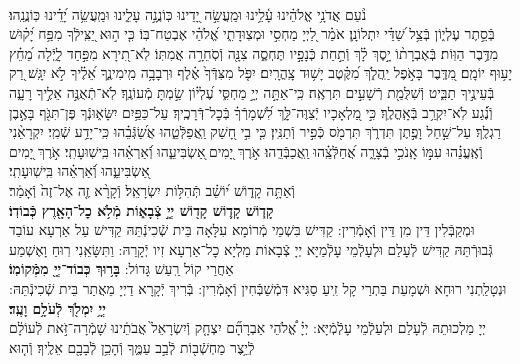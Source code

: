 \documentclass[twoside, openany, parskip=half, 11pt]{book}
\begin{document}
\halfkaddish


\label{vihi noam}
 \\
נֹ֨עַם אֲדֹנָ֥י אֱלֹהֵ֗ינוּ עָ֫לֵ֥ינוּ וּמַֽעֲשֵׂ֣ה יָ֭דֵינוּ כּֽוֹנֲנָ֣ה עָלֵ֑ינוּ וּמַֽעֲשֵׂ֥ה יָ֝דֵ֗ינוּ כּֽוֹנֲנֵֽהוּ׃\\
בְּֿסֵ֣תֶר עֶלְי֑וֹן בְּֿצֵ֥ל שַׁ֝דַּ֗י יִתְלוֹנָֽן׃
אֹמַ֗ר לַ֭יְיָ מַחְסִ֣י וּמְצֽוּדָתִ֑י אֱ֝לֹהַ֗י אֶבְטַח־בּֽוֹ׃
כִּ֤י ה֣וּא יַ֭צִּֽילְֿךָ מִפַּ֥ח יָ֝ק֗וּשׁ מִדֶּ֥בֶר הַוּֽוֹת׃
בְּֿאֶבְרָת֨וֹ יָ֣סֶךְ לָ֗ךְ וְֿתַ֣חַת כְּֿנָפָ֣יו תֶּחְסֶ֑ה צִנָּ֖ה וְֿסֹֽחֵרָ֣ה אֲמִתּֽוֹ׃
לֹֽא־תִ֭ירָא מִפַּ֣חַד לָ֑יְֿלָה מֵ֝חֵ֗ץ יָע֥וּף יוֹמָֽם׃
מִ֭דֶּֽבֶר בָּאֹ֣פֶל יַֽהֲלֹ֑ךְ מִ֝קֶּ֗טֶב יָשׁ֥וּד צָֽהֳרָֽיִם׃
יִפֹּ֤ל מִצִּדְּֿךָ֙ אֶ֗לֶף וּרְבָבָ֥ה מִֽימִינֶ֑ךָ אֵ֝לֶ֗יךָ לֹ֣א יִגָּֽשׁ׃
רַ֭ק בְּֿעֵינֶ֣יךָ תַבִּ֑יט וְֿשִׁלֻּמַ֖ת רְֿשָׁעִ֣ים תִּרְאֶֽה׃
כִּֽי־אַתָּ֣ה יְיָ֣ מַחְסִּ֑י עֶ֝לְי֗וֹן שַׂ֣מְתָּ מְֿעוֹנֶֽךָ׃
לֹֽא־תְֿאֻנֶּ֣ה אֵלֶ֣יךָ רָעָ֑ה וְֿנֶ֗֝גַע לֹֽא־יִקְרַ֥ב בְּֿאָֽהֳלֶֽךָ׃
כִּ֣י מַ֭לְאָכָיו יְֿצַוֶּה־לָּ֑ךְ לִ֝שְׁמָרְֿךָ֗ בְּֿכׇל־דְּֿרָכֶֽיךָ׃
עַל־כַּפַּ֥יִם יִשָּׂא֑וּנְֿךָ פֶּן־תִּגֹּ֖ף בָּאֶ֣בֶן רַגְלֶֽךָ׃
עַל־שַׁ֣חַל וָפֶ֣תֶן תִּדְרֹ֑ךְ תִּרְמֹ֖ס כְּֿפִ֣יר וְֿתַנִּֽין׃
כִּ֤י בִ֣י חָ֭שַׁק וַֽאֲפַלְּֿטֵ֑הוּ אֲשַׂ֝גְּֿבֵ֗הוּ כִּֽי־יָדַ֥ע שְֿׁמִֽי׃
יִקְרָאֵ֨נִי וְֽֿאֶֽעֱנֵ֗הוּ עִמּ֣וֹ אָֽנֹכִ֣י בְֿצָרָ֑ה אֲ֝חַלְּֿצֵֽ֗הוּ וַֽאֲכַבְּֿדֵֽהוּ׃
אֹ֣רֶךְ יָ֭מִים ֖אַשְׂבִּיעֵ֑הוּ וְֿ֝אַרְאֵ֗הוּ בִּֽישֽׁוּעָתִֽי׃
אֹ֣רֶךְ יָ֭מִים ֖אַשְׂבִּיעֵ֑הוּ וְֿ֝אַרְאֵ֗הוּ בִּֽישֽׁוּעָתִֽי׃\\
\label{v ata kadosh}
וְֿאַתָּ֥ה
%
קָד֑וֹשׁ י֝וֹשֵׁ֗ב תְּֿהִלּ֥וֹת יִשְׂרָאֵֽל׃
%
וְֿקָרָ֨א זֶ֤ה אֶל־זֶה֙ וְֿאָמַ֔ר׃\\
\textbf{קָד֧וֹשׁ קָד֛וֹשׁ קָד֖וֹשׁ יְיָ֣ צְֿבָא֑וֹת מְֿלֹ֥א כׇל־הָאָ֖רֶץ כְּֿבוֹדֽוֹ׃}\\
וּמְקַבְּֿלִין דֵּין מִן דֵּין וְֿאָמְֿרִין: קַדִּישׁ בִּשְׁמֵי מְֿרוֹמָא עִלָּאָה בֵּית שְֿׁכִינְֿתֵּהּ קַדִּישׁ עַל אַרְעָא עוֹבַד גְּֿבוּרְֿתֵּהּ קַדִּישׁ לְֿעָלַם וּלְעָלְֿמֵי עָלְֿמַיָּא יְיָ צְֿבָאוֹת מַלְיָא כׇל־אַרְעָא זִיו יְֿקָרֵהּ:  וַתִּשָּׂאֵֽנִי רֽוּחַ וָאֶשְׁמַע אַחֲרַי קוֹל רַֽעַשׁ גָּדוֹל:
\textbf{בָּר֥וּךְ כְּבוֹד־יְיָ֖ מִמְּֿקוֹמֽוֹ׃} \\
וּנְטָלַֽתְנִי רוּחָא וּשְׁמָעֵת בַּתְרַי קָל זִֽיעַ סַגִּיא דִּמְֿשַׁבְּֿחִין וְֿאָמְֿרִין: בְּֿרִיךְ יְֿקָרָא דַיְיָ מֵאֲתַר בֵּית שְֿׁכִינְֿתֵּהּ:
\textbf{יְיָ֥ יִמְלֹ֖ךְ לְֿעֹלָ֥ם וָעֶֽד׃} \\
יְיָ מַלְכוּתֵהּ לְֿעָלַם וּלְעַלְֿמֵי עָלְֿמְֿיָּא: יְיָ֗
%
אֱ֠לֹהֵי אַבְרָהָ֞ם יִצְחָ֤ק וְֿיִשְׂרָאֵל֙ אֲבֹתֵ֔ינוּ שָׁמְֿרָה־זֹּ֣את לְֿעוֹלָ֔ם לְֿיֵ֥צֶר מַחְשְֿׁב֖וֹת לְֿבַ֣ב עַמֶּ֑ךָ וְֿהָכֵ֥ן לְֿבָבָ֖ם אֵלֶֽיךָ׃ וְֿה֤וּא
\end{document}
